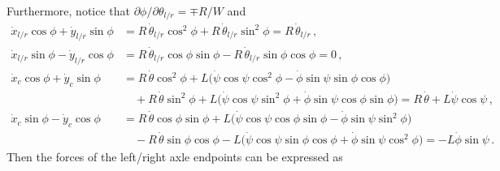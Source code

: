 \documentclass[a4paper]{article}
\newcommand{\pitch}{\psi}
\newcommand{\yaw}{\phi}
\newcommand{\roll}{\theta}
\begin{document}
Furthermore, notice that $\partial\yaw / \partial\roll_{l/r} = \mp R/W$ and
\begin{equation} \begin{split}
\label{eq:xy-lr}
    \dot{x}_{l/r} \cos\yaw + \dot{y}_{l/r} \sin\yaw
        &= R \, \dot\roll_{l/r} \cos^2\yaw + R \, \dot\roll_{l/r} \sin^2\yaw
         = R \, \dot\roll_{l/r}
    \,, \\
    \dot{x}_{l/r} \sin\yaw - \dot{y}_{l/r} \cos\yaw
        &= R \, \dot\roll_{l/r} \cos\yaw \sin\yaw
         - R \, \dot\roll_{l/r} \sin\yaw \cos\yaw
         = 0
    \,, \\
    \dot{x}_c \cos\yaw + \dot{y}_c \sin\yaw
        &= R \, \dot\roll \cos^2\yaw 
         + L \big( \dot\pitch \cos\pitch \cos^2\yaw
                 - \dot\yaw \sin\pitch \sin\yaw \cos\yaw
             \big)
        \\ &\quad
         + R \, \dot\roll \sin^2\yaw 
         + L \big( \dot\pitch \cos\pitch \sin^2\yaw
                 + \dot\yaw \sin\pitch \cos\yaw \sin\yaw
             \big)
         = R \, \dot\roll + L \dot\pitch \cos\pitch
    \,, \\
    \dot{x}_c \sin\yaw - \dot{y}_c \cos\yaw
        &= R \, \dot\roll \cos\yaw \sin\yaw
         + L \big( \dot\pitch \cos\pitch \cos\yaw \sin\yaw
                 - \dot\yaw \sin\pitch \sin^2\yaw
             \big)
        \\ &\quad
         - R \, \dot\roll \sin\yaw \cos\yaw
         - L \big( \dot\pitch \cos\pitch \sin\yaw \cos\yaw
                 + \dot\yaw \sin\pitch \cos^2\yaw
             \big)
         = - L \dot\yaw \sin\pitch
    \,.
\end{split} \end{equation}
Then the forces of the left/right axle endpoints can be expressed as
\end{document}
